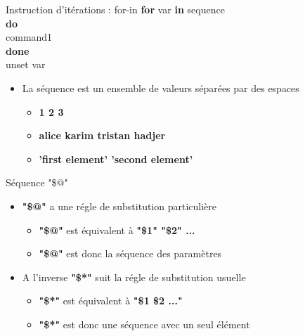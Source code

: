 \documentclass[xcolor=table]{beamer}
\begin{document}
\begin{frame}{Instruction d'itérations : for-in}
\textbf{for} var \textbf{in} sequence\\
\textbf{do}\\
\quad command1\\
\textbf{done}\\
unset var\\
\begin{itemize}
    \item La séquence est un ensemble de valeurs séparées par des espaces
    \begin{itemize}
        \item \textbf{1 2 3}
        \item \textbf{alice karim tristan hadjer}
        \item \textbf{'first element' 'second element'}
    \end{itemize}
\end{itemize}
\end{frame}

\begin{frame}{Séquence "\$@"}
\begin{itemize}
    \item \textbf{"\$@"} a une régle de substitution particulière
    \begin{itemize}
        \item \textbf{"\$@"} est équivalent à \textbf{"\$1" "\$2" ...}
        \item \textbf{"\$@"} est donc la séquence des paramètres
    \end{itemize}
    \item A l'inverse \textbf{"\$*"} suit la régle de substitution usuelle
    \begin{itemize}
        \item \textbf{"\$*"} est équivalent à \textbf{"\$1 \$2 ..."}
        \item \textbf{"\$*"} est donc une séquence avec un seul élément
    \end{itemize}
\end{itemize}
\end{frame}
\end{document}
